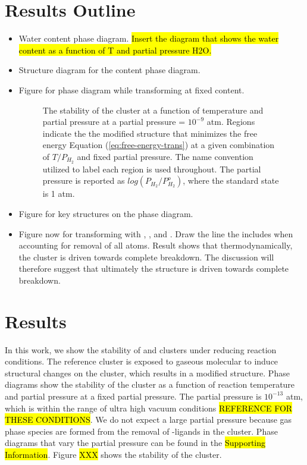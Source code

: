 \documentclass[journal=jctcce,manuscript=article]{achemso}
\begin{document}
\newpage
\section{Results Outline}

\begin{itemize}
    \item Water content phase diagram. \hl{Insert the diagram that shows the water content as a function of T and partial pressure H2O.}
    \item Structure diagram for the content phase diagram. 
    \item Figure for phase diagram while transforming at fixed  content. 
        \begin{figure}
            \centering
            \caption{The stability of the  cluster at a function of temperature and  partial pressure at a  partial pressure = $10^{-9}$ atm. Regions indicate the the modified structure that minimizes the free energy Equation (\ref{eq:free-energy-trans}) at a given combination of $T/P_{H_{2}}$ and fixed  partial pressure. The name convention utilized to label each region is used throughout. The  partial pressure is reported as $log(P_{H_{2}}/P_{H_{2}}^{o})$, where the standard state is 1 atm.}
            \label{fig:phase_diagram_TandP}
        \end{figure}
    \item Figure for key structures on the phase diagram. 
    \item Figure now for transforming with , , and . Draw the line the includes when accounting for removal of all  atoms. Result shows that thermodynamically, the cluster is driven towards complete breakdown. The discussion will therefore suggest that ultimately the structure is driven towards complete breakdown. 
\end{itemize}



\newpage
\section{Results}
In this work, we show the stability of  and  clusters under reducing reaction conditions. The reference cluster is exposed to gaseous molecular  to induce structural changes on the cluster, which results in a modified structure. Phase diagrams show the stability of the cluster as a function of reaction temperature and  partial pressure at a fixed  partial pressure. The  partial pressure is {$10^{-13}$} atm, which is within the range of ultra high vacuum conditions \hl{REFERENCE FOR THESE CONDITIONS}. We do not expect a large  partial pressure because gas phase  species are formed from the removal of -ligands in the cluster. Phase diagrams that vary the  partial pressure can be found in the \hl{Supporting Information}. Figure \hl{XXX} shows the stability of the  cluster. 
\end{document}
